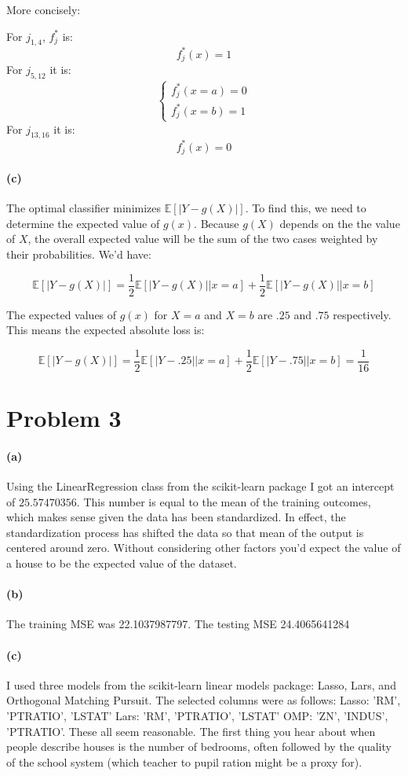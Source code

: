 \documentclass[twoside,11pt]{homework}
\begin{document}
More concisely:

For $j_{1,4}$, $f_j^*$  is: 
$$f_j^*(x) = 1$$ For $j_{5,12}$ it is:
$$\begin{cases} 
	f_j^*(x=a) = 0 \\
	f_j^*(x=b) = 1
\end{cases} $$ For $j_{13,16}$ it is:
$$f_j^*(x) = 0$$ 

\paragraph{(c)}
The optimal classifier minimizes $\mathbb{E}[|Y - g(X)|]$.  To find this, we need to determine the expected value of $g(x)$.  Because $g(X)$ depends on the the value of $X$, the overall expected value will be the sum of the two cases weighted by their probabilities.  We'd have:

$$ 
\mathbb{E}[|Y - g(X)|] = \frac{1}{2} \mathbb{E}[|Y - g(X)|| x = a] + \frac{1}{2} \mathbb{E}[|Y - g(X)|| x = b] 
$$

The expected values of $g(x)$ for $X = a$ and $X = b$ are $.25$ and $.75$ respectively.  This means the expected absolute loss is:

$$ \mathbb{E}[|Y - g(X)|] = \frac{1}{2} \mathbb{E}[|Y - .25|| x = a] + \frac{1}{2} \mathbb{E}[|Y - .75|| x = b]  = \frac{1}{16}$$


\section*{Problem 3}

\paragraph{(a)} Using the LinearRegression class from the scikit-learn package I got an intercept of $25.57470356$.  This number is equal to the mean of the training outcomes, which makes sense given the data has been standardized.  In effect, the standardization process has shifted the data so that mean of the output is centered around zero.  Without considering other factors you'd expect the value of a house to be the expected value of the dataset. 

\paragraph{(b)} The training MSE was 22.1037987797.  The testing MSE 24.4065641284

\paragraph{(c)} I used three models from the scikit-learn linear models package: Lasso, Lars, and Orthogonal Matching Pursuit.  The selected columns were as follows: 
Lasso: 'RM', 'PTRATIO', 'LSTAT' 
Lars: 'RM', 'PTRATIO', 'LSTAT' 
OMP: 'ZN', 'INDUS', 'PTRATIO'.  These all seem reasonable.  The first thing you hear about when people describe houses is the number of bedrooms, often followed by the quality of the school system (which teacher to pupil ration might be a proxy for).
\end{document}
